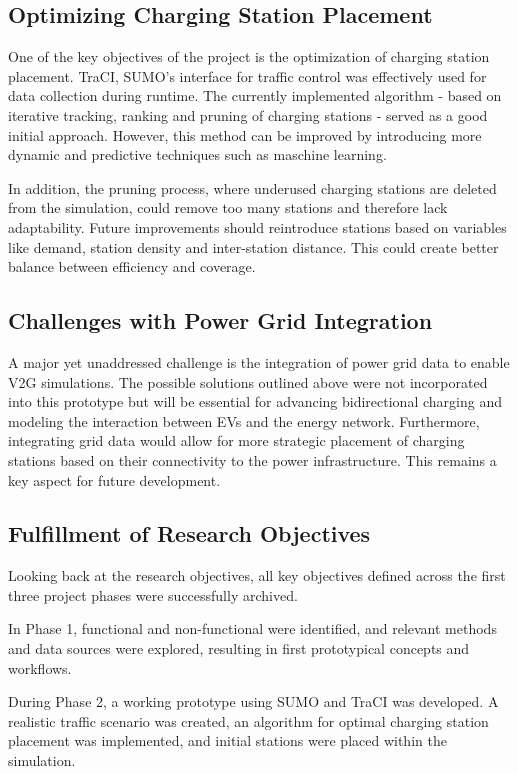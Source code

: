 \subsection{Optimizing Charging Station Placement}
One of the key objectives of the project is the optimization of charging station placement. TraCI, SUMO's interface for traffic control was effectively used for data collection during runtime. The currently implemented algorithm - based on iterative tracking, ranking and pruning of charging stations - served as a good initial approach. However, this method can be improved by introducing more dynamic and predictive techniques such as maschine learning.

In addition, the pruning process, where underused charging stations are deleted from the simulation, could remove too many stations and therefore lack adaptability. Future improvements should reintroduce stations based on variables like demand, station density and inter-station distance. This could create better balance between efficiency and coverage.

\subsection{Challenges with Power Grid Integration}
A major yet unaddressed challenge is the integration of power grid data to enable V2G simulations. The possible solutions outlined above were not incorporated into this prototype but will be essential for advancing bidirectional charging and modeling the interaction between EVs and the energy network. Furthermore, integrating grid data would allow for more strategic placement of charging stations based on their connectivity to the power infrastructure. This remains a key aspect for future development.

\subsection{Fulfillment of Research Objectives}
Looking back at the research objectives, all key objectives defined across the first three project phases were successfully archived.

In Phase 1, functional and non-functional were identified, and relevant methods and data sources were explored, resulting in first prototypical concepts and workflows.

During Phase 2, a working prototype using SUMO and TraCI was developed. A realistic traffic scenario was created, an algorithm for optimal charging station placement was implemented, and initial stations were placed within the simulation.

